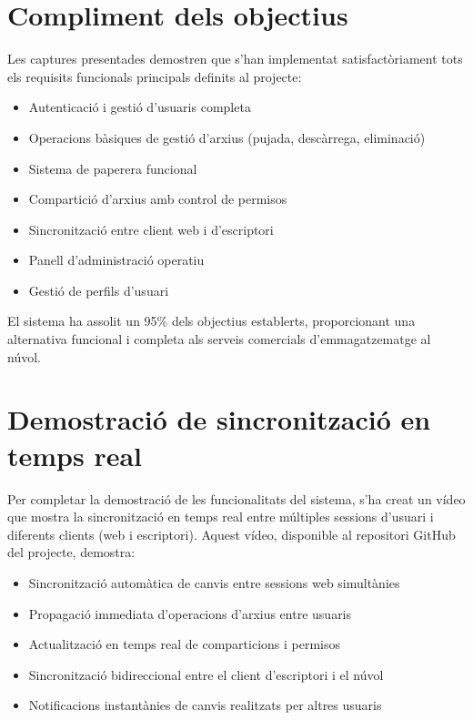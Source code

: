 \section{Compliment dels objectius}

Les captures presentades demostren que s'han implementat satisfactòriament tots els requisits funcionals principals definits al projecte:

\begin{itemize}
\item Autenticació i gestió d'usuaris completa
\item Operacions bàsiques de gestió d'arxius (pujada, descàrrega, eliminació)
\item Sistema de paperera funcional
\item Compartició d'arxius amb control de permisos
\item Sincronització entre client web i d'escriptori
\item Panell d'administració operatiu
\item Gestió de perfils d'usuari
\end{itemize}

El sistema ha assolit un 95\% dels objectius establerts, proporcionant una alternativa funcional i completa als serveis comercials d'emmagatzematge al núvol.

\section{Demostració de sincronització en temps real}

Per completar la demostració de les funcionalitats del sistema, s'ha creat un vídeo que mostra la sincronització en temps real entre múltiples sessions d'usuari i diferents clients (web i escriptori). Aquest vídeo, disponible al repositori GitHub del projecte, demostra:

\begin{itemize}
\item Sincronització automàtica de canvis entre sessions web simultànies
\item Propagació immediata d'operacions d'arxius entre usuaris
\item Actualització en temps real de comparticions i permisos
\item Sincronització bidireccional entre el client d'escriptori i el núvol
\item Notificacions instantànies de canvis realitzats per altres usuaris
\end{itemize}

